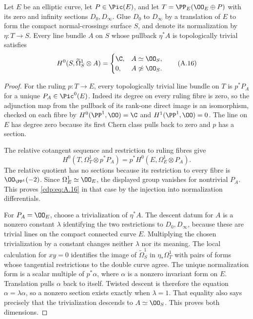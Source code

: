 
\begin{proposition}\label{cdp:st:A.4.3}
Let $E$ be an elliptic curve, let $P\in\Pic(E)$, and let $T=\PP_E(\OO_E\oplus P)$ with its zero and infinity sections $D_0,D_\infty$. Glue $D_0$ to $D_\infty$ by a translation of $E$ to form the compact normal-crossings surface $S$, and denote its normalization by $\eta:T\to S$. Every line bundle $A$ on $S$ whose pullback $\eta^*A$ is topologically trivial satisfies
\[
H^0(S,\widetilde\Omega_S^1\otimes A)=
\begin{cases}\C,&A\simeq\OO_S,\\0,&A\not\simeq\OO_S.\end{cases}
\tag{A.16}\label{cdp:eq:A.16}
\]
\end{proposition}
\begin{proof}
For the ruling $p:T\to E$, every topologically trivial line bundle on $T$ is $p^*P_A$ for a unique $P_A\in\Pic^0(E)$. Indeed its degree on every ruling fibre is zero, so the adjunction map from the pullback of its rank-one direct image is an isomorphism, checked on each fibre by $H^0(\PP^1,\OO)=\C$ and $H^1(\PP^1,\OO)=0$. The line on $E$ has degree zero because its first Chern class pulls back to zero and $p$ has a section.

The relative cotangent sequence and restriction to ruling fibres give
\[
 H^0(T,\Omega_T^1\otimes p^*P_A)
 =p^*H^0(E,\Omega_E^1\otimes P_A).
\]
The relative quotient has no sections because its restriction to every fibre is $\OO_{\PP^1}(-2)$. Since $\Omega_E^1\simeq\OO_E$, the displayed group vanishes for nontrivial $P_A$. This proves \eqref{cdp:eq:A.16} in that case by the injection into normalization differentials.

For $P_A=\OO_E$, choose a trivialization of $\eta^*A$. The descent datum for $A$ is a nonzero constant $\lambda$ identifying the two restrictions to $D_0,D_\infty$, because these are trivial lines on the compact connected curve $E$. Multiplying the chosen trivialization by a constant changes neither $\lambda$ nor its meaning. The local calculation for $xy=0$ identifies the image of $\widetilde\Omega_S^1$ in $\eta_*\Omega_T^1$ with pairs of forms whose tangential restrictions to the double curve agree. The unique normalization form is a scalar multiple of $p^*\alpha$, where $\alpha$ is a nonzero invariant form on $E$. Translation pulls $\alpha$ back to itself. Twisted descent is therefore the equation $\alpha=\lambda\alpha$, so a nonzero section exists exactly when $\lambda=1$. That equality also says precisely that the trivialization descends to $A\simeq\OO_S$. This proves both dimensions.
\end{proof}


